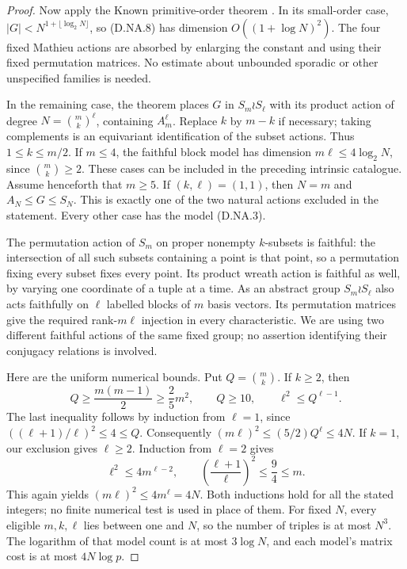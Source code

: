 \begin{proof}
Now apply the Known primitive-order theorem
\citep[Theorem 1.1 and complete written Section 2,
pp.~2 and 4--8 of the author version]{C_Maroti2002PrimitiveOrders}.
In its small-order case,
$|G|<N^{1+\lfloor\log_2N\rfloor}$, so (D.NA.8)
has dimension $O((1+\log N)^2)$.
The four fixed Mathieu actions are absorbed by enlarging
the constant and using their fixed permutation matrices.
No estimate about unbounded sporadic or other unspecified
families is needed.

In the remaining case, the theorem places $G$ in
$S_m\wr S_\ell$ with its product action of degree
$N=\binom{m}{k}^{\ell}$, containing $A_m^\ell$.
Replace $k$ by $m-k$ if necessary; taking complements
is an equivariant identification of the subset actions.
Thus $1\le k\le m/2$. If $m\le4$, the faithful block
model has dimension $m\ell\le4\log_2N$, since
$\binom{m}{k}\ge2$. These cases can be included in
the preceding intrinsic catalogue.
Assume henceforth that $m\ge5$.
If $(k,\ell)=(1,1)$, then $N=m$ and
$A_N\le G\le S_N$. This is exactly one of the two
natural actions excluded in the statement.
Every other case has the model (D.NA.3).

The permutation action of $S_m$ on proper nonempty
$k$-subsets is faithful: the intersection of all such
subsets containing a point is that point, so a permutation
fixing every subset fixes every point. Its product wreath
action is faithful as well, by varying one coordinate
of a tuple at a time. As an abstract group
$S_m\wr S_\ell$ also acts faithfully on $\ell$ labelled
blocks of $m$ basis vectors. Its permutation matrices
give the required rank-$m\ell$ injection in every
characteristic. We are using two different faithful
actions of the same fixed group; no assertion identifying
their conjugacy relations is involved.

Here are the uniform numerical bounds. Put
$Q=\binom{m}{k}$. If $k\ge2$, then
\[
 Q\ge\frac{m(m-1)}2\ge\frac25m^2,\qquad Q\ge10,
 \qquad \ell^2\le Q^{\ell-1}.                           \tag{D.NA.9}
\]
The last inequality follows by induction from $\ell=1$,
since $((\ell+1)/\ell)^2\le4\le Q$. Consequently
$(m\ell)^2\le(5/2)Q^\ell\le4N$.
If $k=1$, our exclusion gives $\ell\ge2$.
Induction from $\ell=2$ gives
\[
 \ell^2\le4m^{\ell-2},\qquad
 \left(\frac{\ell+1}{\ell}\right)^2
                        \le\frac94\le m.               \tag{D.NA.10}
\]
This again yields $(m\ell)^2\le4m^\ell=4N$.
Both inductions hold for all the stated integers;
no finite numerical test is used in place of them.
For fixed $N$, every eligible $m,k,\ell$ lies between
one and $N$, so the number of triples is at most $N^3$.
The logarithm of that model count is at most $3\log N$,
and each model's matrix cost is at most $4N\log p$.


\end{proof}

